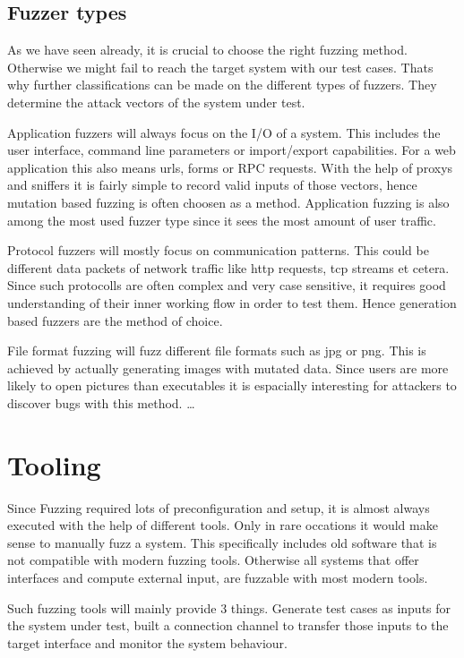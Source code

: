 \documentclass[journal=tosc,final]{iacrtrans}
\begin{document}
\subsection{Fuzzer types}
As we have seen already, it is crucial to choose the right fuzzing method. Otherwise we might fail to reach the target system with our test cases. Thats why further classifications can be made on the different types of fuzzers. They determine the attack vectors of the system under test. 

Application fuzzers will always focus on the I/O of a system. This includes the user interface, command line parameters or import/export capabilities. For a web application this also means urls, forms or RPC requests. With the help of proxys and sniffers it is fairly simple to record valid inputs of those vectors, hence mutation based fuzzing is often choosen as a method. Application fuzzing  is also among the most used fuzzer type since it sees the most amount of user traffic.

Protocol fuzzers will mostly focus on communication patterns. This could be different data packets of network traffic like http requests, tcp streams et cetera. Since such protocolls are often complex and very case sensitive, it requires good understanding of their inner working flow in order to test them. Hence generation based fuzzers are the method of choice.

File format fuzzing will fuzz different file formats such as jpg or png. This is achieved by actually generating images with mutated data. Since users are more likely to open pictures than executables it is espacially interesting for attackers to discover bugs with this method.  \dots
\newpage
\section{Tooling}
Since Fuzzing required lots of preconfiguration and setup, it is almost always executed with the help of different tools. Only in rare occations it would make sense to manually fuzz a system. This specifically includes old software that is not compatible with modern fuzzing tools. Otherwise all systems that offer interfaces and compute external input, are fuzzable with most modern tools. 

Such fuzzing tools will mainly provide 3 things. Generate test cases as inputs for the system under test, built a connection channel to transfer those inputs to the target interface and monitor the system behaviour.
\end{document}
